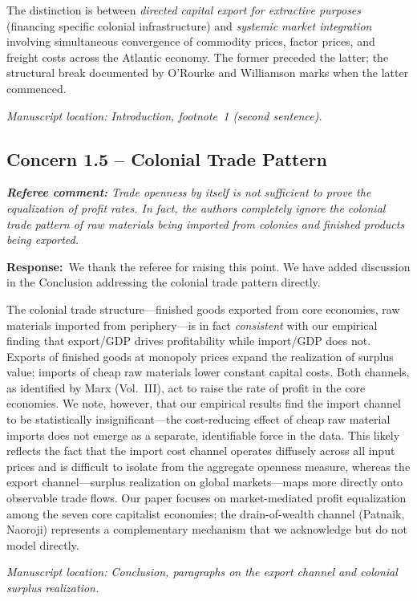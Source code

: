 \documentclass[11pt]{article}
\newcommand{\RC}[1]{\begin{refereebox}\textit{\textbf{Referee comment:} #1}\end{refereebox}}
\newcommand{\AR}{\noindent\textbf{Response:}\ }
\begin{document}
The distinction is between \emph{directed capital export for extractive purposes} (financing specific colonial infrastructure) and \emph{systemic market integration} involving simultaneous convergence of commodity prices, factor prices, and freight costs across the Atlantic economy. The former preceded the latter; the structural break documented by O'Rourke and Williamson marks when the latter commenced.

\smallskip\noindent\textit{Manuscript location: Introduction, footnote~1 (second sentence).}

\subsection*{Concern 1.5 -- Colonial Trade Pattern}

\RC{Trade openness by itself is not sufficient to prove the equalization of profit rates. In fact, the authors completely ignore the colonial trade pattern of raw materials being imported from colonies and finished products being exported.}

\AR We thank the referee for raising this point. We have added discussion in the Conclusion addressing the colonial trade pattern directly.

The colonial trade structure---finished goods exported from core economies, raw materials imported from periphery---is in fact \emph{consistent} with our empirical finding that export/GDP drives profitability while import/GDP does not. Exports of finished goods at monopoly prices expand the realization of surplus value; imports of cheap raw materials lower constant capital costs. Both channels, as identified by Marx (Vol.~III), act to raise the rate of profit in the core economies. We note, however, that our empirical results find the import channel to be statistically insignificant---the cost-reducing effect of cheap raw material imports does not emerge as a separate, identifiable force in the data. This likely reflects the fact that the import cost channel operates diffusely across all input prices and is difficult to isolate from the aggregate openness measure, whereas the export channel---surplus realization on global markets---maps more directly onto observable trade flows. Our paper focuses on market-mediated profit equalization among the seven core capitalist economies; the drain-of-wealth channel (Patnaik, Naoroji) represents a complementary mechanism that we acknowledge but do not model directly.

\smallskip\noindent\textit{Manuscript location: Conclusion, paragraphs on the export channel and colonial surplus realization.}
\end{document}
